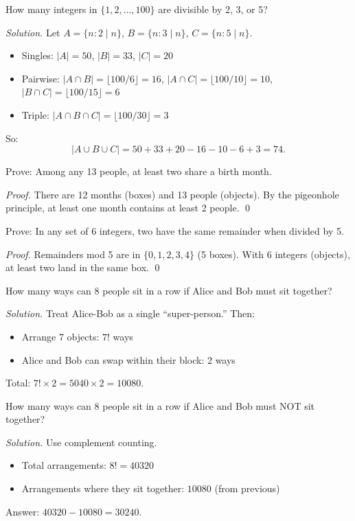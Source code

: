 \begin{example}
How many integers in $\{1, 2, \ldots, 100\}$ are divisible by 2, 3, or 5?

\emph{Solution.} Let $A = \{n : 2 \mid n\}$, $B = \{n : 3 \mid n\}$, $C = \{n : 5 \mid n\}$.
\begin{itemize}
  \item Singles: $|A| = 50$, $|B| = 33$, $|C| = 20$
  \item Pairwise: $|A \cap B| = \lfloor 100/6 \rfloor = 16$, $|A \cap C| = \lfloor 100/10 \rfloor = 10$, $|B \cap C| = \lfloor 100/15 \rfloor = 6$
  \item Triple: $|A \cap B \cap C| = \lfloor 100/30 \rfloor = 3$
\end{itemize}
So:
\[
|A \cup B \cup C| = 50 + 33 + 20 - 16 - 10 - 6 + 3 = 74.
\]
\end{example}

\begin{example}
Prove: Among any 13 people, at least two share a birth month.

\emph{Proof.} There are 12 months (boxes) and 13 people (objects). By the pigeonhole principle, at least one month contains at least 2 people. \qed
\end{example}

\begin{example}
Prove: In any set of 6 integers, two have the same remainder when divided by 5.

\emph{Proof.} Remainders mod 5 are in $\{0, 1, 2, 3, 4\}$ (5 boxes). With 6 integers (objects), at least two land in the same box. \qed
\end{example}

\begin{example}
How many ways can 8 people sit in a row if Alice and Bob must sit together?

\emph{Solution.} Treat Alice-Bob as a single ``super-person.'' Then:
\begin{itemize}
  \item Arrange 7 objects: $7!$ ways
  \item Alice and Bob can swap within their block: 2 ways
\end{itemize}
Total: $7! \times 2 = 5040 \times 2 = 10080$.
\end{example}

\begin{example}
How many ways can 8 people sit in a row if Alice and Bob must NOT sit together?

\emph{Solution.} Use complement counting.
\begin{itemize}
  \item Total arrangements: $8! = 40320$
  \item Arrangements where they sit together: $10080$ (from previous)
\end{itemize}
Answer: $40320 - 10080 = 30240$.
\end{example}

